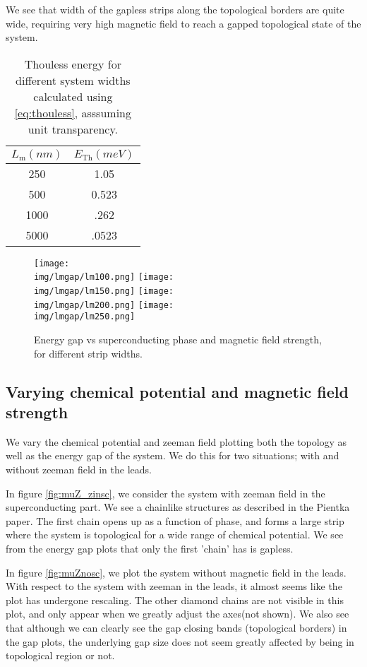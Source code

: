 \documentclass[10pt,a4paper]{article}
\newcommand{\img}{./images}
\begin{document}
	 We see that width of the gapless strips along the topological borders are quite wide, requiring very high magnetic field to reach a gapped topological state of the system.
	\begin{table}[H]
		\centering
		\begin{tabular}{|c|c|}
			\hline 
			$L_\text{m} (nm)$ & $E_\text{Th} (meV)$ \\ 
			\hline 
			250 & 1.05 \\ 
			\hline 
			500 & 0.523 \\ 
			\hline 
			1000 & .262 \\ 
			\hline 
			5000 & .0523 \\ 
			\hline 
		\end{tabular} 
		\caption{Thouless energy for different system widths calculated using \ref{eq:thouless}, asssuming unit transparency.}
		\label{table:thouless}
	\end{table}
	
	
	\begin{figure}[H]
		\texttt{[image: \\img/lmgap/lm100.png]}
		\texttt{[image: \\img/lmgap/lm150.png]}
		\texttt{[image: \\img/lmgap/lm200.png]}
		\texttt{[image: \\img/lmgap/lm250.png]}
		\caption{Energy gap vs superconducting phase and magnetic field strength, for different strip widths.}
		\label{fig:lmZPgap}
	\end{figure}
\newpage	
	\subsection{Varying chemical potential and magnetic field strength}
		We vary the chemical potential and zeeman field plotting both the topology as well as the energy gap of the system.
		We do this for two situations; with and without zeeman field in the leads.
		
		In figure \ref{fig:muZ_zinsc}, we consider the system with zeeman field in the superconducting part.
		We see a chainlike structures as described in the Pientka paper.
		The first chain opens up as a function of phase, and forms a large strip where the system is topological for a wide range of chemical potential.
		We see from the energy gap plots that only the first 'chain' has is gapless.
		
		In figure \ref{fig:muZnosc}, we plot the system without magnetic field in the leads.
		With respect to the system with zeeman in the leads, it almost seems like the plot has undergone rescaling.
		The other diamond chains are not visible in this plot, and only appear when we greatly adjust the axes(not shown).
		We also see that although we can clearly see the gap closing bands (topological borders) in the gap plots, the underlying gap size does not seem greatly affected by being in topological region or not.
\end{document}
